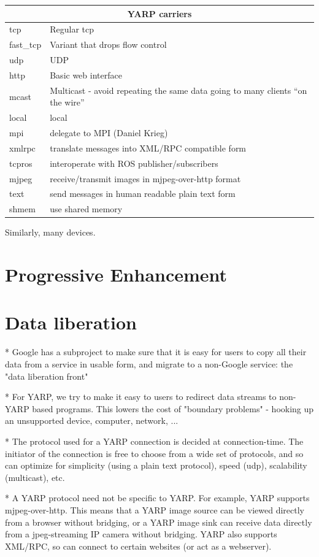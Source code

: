 \documentclass[letterpaper]{article}
\begin{document}
\begin{tabular}{|l|p{7cm}|}
\hline
\multicolumn{2}{|c|}{YARP carriers} \\
\hline
tcp & Regular tcp \\
fast\_tcp & Variant that drops flow control \\
udp & UDP \\
http & Basic web interface \\
mcast & Multicast - avoid repeating the same data going
to many clients ``on the wire''  \\
local & local \\
mpi & delegate to MPI (Daniel Krieg) \\
xmlrpc & translate messages into XML/RPC compatible form \\
tcpros & interoperate with ROS publisher/subscribers \\
mjpeg & receive/transmit images in mjpeg-over-http format \\
text & send messages in human readable plain text form \\
shmem & use shared memory \\
\hline
\end{tabular}

Similarly, many devices.

\section{Progressive Enhancement}

\section{Data liberation}

* Google has a subproject to make sure that it is easy for users to copy all their data from a service in usable form, and migrate to a non-Google service: the "data liberation front"

* For YARP, we try to make it easy to users to redirect data streams to non-YARP based programs.  This lowers the cost of "boundary problems" - hooking up an unsupported device, computer, network, ...

* The protocol used for a YARP connection is decided at connection-time.  The initiator of the connection is free to choose from a wide set of protocols, and so can optimize for simplicity (using a plain text protocol), speed (udp), scalability (multicast), etc.  

* A YARP protocol need not be specific to YARP.  For example, YARP supports mjpeg-over-http.  This means that a YARP image source can be viewed directly from a browser without bridging, or a YARP image sink can receive data directly from a jpeg-streaming IP camera without bridging.  YARP also supports XML/RPC, so can connect to certain websites (or act as a webserver).
\end{document}

